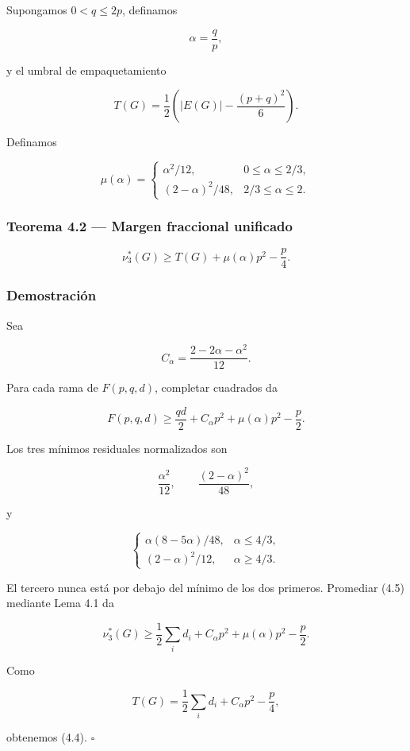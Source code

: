 \documentclass[spanish,11pt,a4paper]{article}
\begin{document}
Supongamos \(0<q\le2p\), definamos

\[
\alpha=\frac qp,
\]

y el umbral de empaquetamiento

\[
T(G)=\frac12\left(|E(G)|-\frac{(p+q)^2}{6}\right).
\tag{4.2}
\]

Definamos

\[
\mu(\alpha)
=
\begin{cases}
\alpha^2/12,&0\le\alpha\le2/3,\\
(2-\alpha)^2/48,&2/3\le\alpha\le2.
\end{cases}
\tag{4.3}
\]

\subsubsection{Teorema 4.2 --- Margen fraccional
unificado}\label{teorema-4.2-margen-fraccional-unificado}

\[
\boxed{
\nu_3^*(G)
\ge
T(G)+\mu(\alpha)p^2-\frac p4
}.
\tag{4.4}
\]

\subsubsection{Demostración}\label{demostraciuxf3n-2}

Sea

\[
C_\alpha=\frac{2-2\alpha-\alpha^2}{12}.
\]

Para cada rama de \(F(p,q,d)\), completar cuadrados da

\[
F(p,q,d)
\ge
\frac{qd}{2}+C_\alpha p^2+\mu(\alpha)p^2-\frac p2.
\tag{4.5}
\]

Los tres mínimos residuales normalizados son

\[
\frac{\alpha^2}{12},
\qquad
\frac{(2-\alpha)^2}{48},
\]

y

\[
\begin{cases}
\alpha(8-5\alpha)/48,&\alpha\le4/3,\\
(2-\alpha)^2/12,&\alpha\ge4/3.
\end{cases}
\]

El tercero nunca está por debajo del mínimo de los dos primeros.
Promediar (4.5) mediante Lema 4.1 da

\[
\nu_3^*(G)
\ge
\frac12\sum_i d_i+C_\alpha p^2+\mu(\alpha)p^2-\frac p2.
\]

Como

\[
T(G)=\frac12\sum_i d_i+C_\alpha p^2-\frac p4,
\]

obtenemos (4.4). \(\square\)
\end{document}
